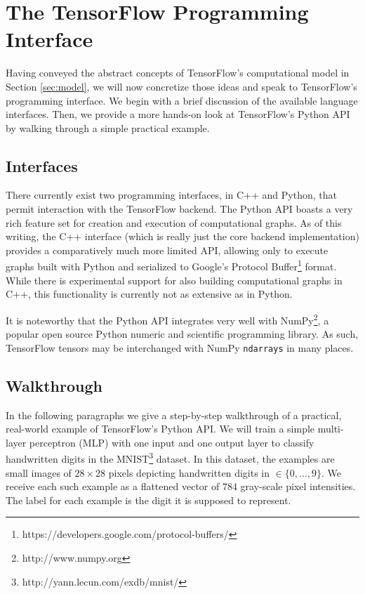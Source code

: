 \section{The TensorFlow Programming Interface}\label{sec:code}

Having conveyed the abstract concepts of TensorFlow's computational model in
Section \ref{sec:model}, we will now concretize those ideas and speak to
TensorFlow's programming interface. We begin with a brief discussion of the
available language interfaces. Then, we provide a more hands-on look at
TensorFlow's Python API by walking through a simple practical example.

\subsection{Interfaces}\label{sec:code-interfaces}

There currently exist two programming interfaces, in C++ and Python, that permit
interaction with the TensorFlow backend. The Python API boasts a very rich
feature set for creation and execution of computational graphs. As of this
writing, the C++ interface (which is really just the core backend
implementation) provides a comparatively much more limited API, allowing only to
execute graphs built with Python and serialized to Google's Protocol
Buffer\footnote{https://developers.google.com/protocol-buffers/} format. While
there is experimental support for also building computational graphs in C++,
this functionality is currently not as extensive as in Python.

It is noteworthy that the Python API integrates very well with
NumPy\footnote{http://www.numpy.org}, a popular open source Python numeric and
scientific programming library. As such, TensorFlow tensors may be interchanged
with NumPy \texttt{ndarrays} in many places.

\subsection{Walkthrough}\label{sec:code-walk}

In the following paragraphs we give a step-by-step walkthrough of a practical,
real-world example of TensorFlow's Python API. We will train a simple
multi-layer perceptron (MLP) with one input and one output layer to classify
handwritten digits in the MNIST\footnote{http://yann.lecun.com/exdb/mnist/}
dataset. In this dataset, the examples are small images of $28 \times 28$ pixels
depicting handwritten digits in $\in \{0, \dots, 9\}$. We receive each such
example as a flattened vector of $784$ gray-scale pixel intensities. The label
for each example is the digit it is supposed to represent.

